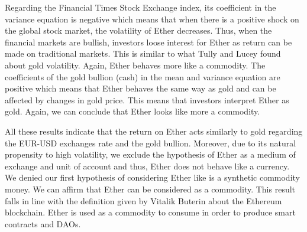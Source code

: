 \documentclass[11pt]{report}
\begin{document}
Regarding the Financial Times Stock Exchange index, its coefficient in the variance equation is negative which means that when there is a positive shock on the global stock market, the volatility of Ether decreases. Thus, when the financial markets are bullish, investors loose interest for Ether as return can be made on traditional markets. This is similar to what Tully and Lucey found about gold volatility. Again, Ether behaves more like a commodity.\newline 
The coefficients of the gold bullion (cash) in the mean and variance equation are positive which means that Ether behaves the same way as gold and can be affected by changes in gold price. This means that investors interpret Ether as gold. Again, we can conclude that Ether looks like more a commodity.\clearpage

All these results indicate that the return on Ether acts similarly to gold regarding the EUR-USD exchanges rate and the gold bullion. Moreover, due to its natural propensity to high volatility, we exclude the hypothesis of Ether as a medium of exchange and unit of account and thus, Ether does not behave like a currency. We denied our first hypothesis of considering Ether like is a synthetic commodity money. We can affirm that Ether can be considered as a commodity. This result falls in line with the definition given by Vitalik Buterin about the Ethereum blockchain. Ether is used as a commodity to consume in order to produce smart contracts and DAOs.


\clearpage	  
\end{document}
